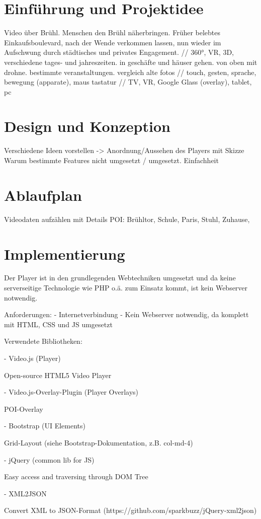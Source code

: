 \chapter{Einführung und Projektidee}
Video über Brühl. Menschen den Brühl näherbringen. Früher belebtes Einkaufsboulevard, nach der Wende verkommen lassen, nun wieder im Aufschwung durch städtisches und privates Engagement. // 360°, VR, 3D, verschiedene tages- und jahreszeiten. in geschäfte und häuser gehen. von oben mit drohne. bestimmte veranstaltungen. vergleich alte fotos // touch, gesten, sprache, bewegung (apparate), maus tastatur // TV, VR, Google Glass (overlay), tablet, pc
\chapter{Design und Konzeption}
Verschiedene Ideen vorstellen -> Anordnung/Aussehen des Players mit Skizze
Warum bestimmte Features nicht umgesetzt / umgesetzt. Einfachheit
\chapter{Ablaufplan}
Videodaten aufzählen mit Details
POI: Brühltor, Schule, Paris, Stuhl, Zuhause, 
\chapter{Implementierung}

Der Player ist in den grundlegenden Webtechniken umgesetzt und da keine serverseitige Technologie wie PHP o.ä. zum Einsatz kommt, ist kein Webserver notwendig.

Anforderungen:
- Internetverbindung
- Kein Webserver notwendig, da komplett mit HTML, CSS und JS umgesetzt

Verwendete Bibliotheken:

- Video.js (Player)

	Open-source HTML5 Video Player
	
- Video.js-Overlay-Plugin (Player Overlays)

	POI-Overlay
	
- Bootstrap (UI Elements)

	Grid-Layout (siehe Bootstrap-Dokumentation, z.B. col-md-4)

- jQuery (common lib for JS)
	
	Easy access and traversing through DOM Tree
	
- XML2JSON

	Convert XML to JSON-Format (https://github.com/sparkbuzz/jQuery-xml2json)
	
